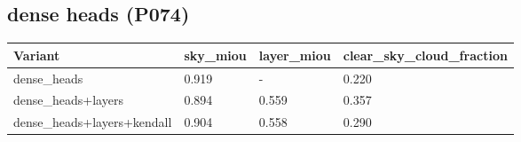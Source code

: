 \subsection{dense heads (P074)}

\begin{center}{\scriptsize\setlength{\tabcolsep}{3pt}
\begin{tabular}{llll}
\toprule
Variant & sky\_miou & layer\_miou & clear\_sky\_cloud\_fraction \\
\midrule
dense\_heads & 0.919 & - & 0.220 \\
dense\_heads+layers & 0.894 & 0.559 & 0.357 \\
dense\_heads+layers+kendall & 0.904 & 0.558 & 0.290 \\
\bottomrule
\end{tabular}}
\end{center}


